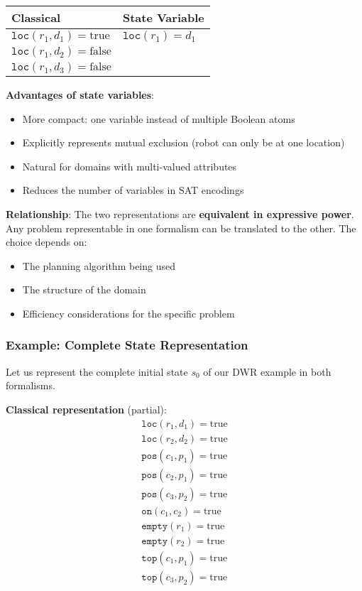 \documentclass[11pt,a4paper]{article}
\theoremstyle{definition}
\theoremstyle{plain}
\theoremstyle{remark}
\begin{document}
\begin{center}
\begin{tabular}{|l|l|}
\hline
\textbf{Classical} & \textbf{State Variable} \\
\hline
$\texttt{loc}(r_1, d_1) = \text{true}$ & $\texttt{loc}(r_1) = d_1$ \\
$\texttt{loc}(r_1, d_2) = \text{false}$ & \\
$\texttt{loc}(r_1, d_3) = \text{false}$ & \\
\hline
\end{tabular}
\end{center}

\textbf{Advantages of state variables}:
\begin{itemize}
    \item More compact: one variable instead of multiple Boolean atoms
    \item Explicitly represents mutual exclusion (robot can only be at one location)
    \item Natural for domains with multi-valued attributes
    \item Reduces the number of variables in SAT encodings
\end{itemize}

\textbf{Relationship}:
The two representations are \textbf{equivalent in expressive power}. Any problem representable in one formalism can be translated to the other. The choice depends on:
\begin{itemize}
    \item The planning algorithm being used
    \item The structure of the domain
    \item Efficiency considerations for the specific problem
\end{itemize}

\subsubsection{Example: Complete State Representation}

Let us represent the complete initial state $s_0$ of our DWR example in both formalisms.

\textbf{Classical representation} (partial):
\[
\begin{array}{l}
\texttt{loc}(r_1, d_1) = \text{true} \\
\texttt{loc}(r_2, d_2) = \text{true} \\
\texttt{pos}(c_1, p_1) = \text{true} \\
\texttt{pos}(c_2, p_1) = \text{true} \\
\texttt{pos}(c_3, p_2) = \text{true} \\
\texttt{on}(c_1, c_2) = \text{true} \\
\texttt{empty}(r_1) = \text{true} \\
\texttt{empty}(r_2) = \text{true} \\
\texttt{top}(c_1, p_1) = \text{true} \\
\texttt{top}(c_3, p_2) = \text{true}
\end{array}
\]
\end{document}
